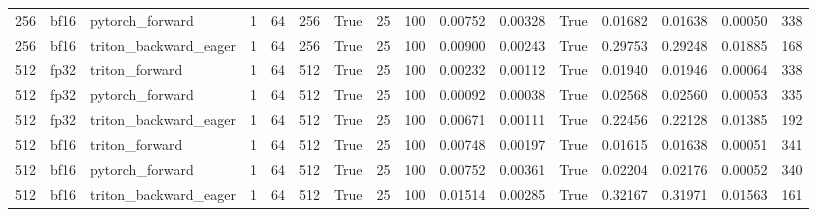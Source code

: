 \begin{tabular}{rllrrrrrrrrrrrrr}
256 & bf16 & pytorch\_forward & 1 & 64 & 256 & True & 25 & 100 & 0.00752 & 0.00328 & True & 0.01682 & 0.01638 & 0.00050 & 338 \\
256 & bf16 & triton\_backward\_eager & 1 & 64 & 256 & True & 25 & 100 & 0.00900 & 0.00243 & True & 0.29753 & 0.29248 & 0.01885 & 168 \\
512 & fp32 & triton\_forward & 1 & 64 & 512 & True & 25 & 100 & 0.00232 & 0.00112 & True & 0.01940 & 0.01946 & 0.00064 & 338 \\
512 & fp32 & pytorch\_forward & 1 & 64 & 512 & True & 25 & 100 & 0.00092 & 0.00038 & True & 0.02568 & 0.02560 & 0.00053 & 335 \\
512 & fp32 & triton\_backward\_eager & 1 & 64 & 512 & True & 25 & 100 & 0.00671 & 0.00111 & True & 0.22456 & 0.22128 & 0.01385 & 192 \\
512 & bf16 & triton\_forward & 1 & 64 & 512 & True & 25 & 100 & 0.00748 & 0.00197 & True & 0.01615 & 0.01638 & 0.00051 & 341 \\
512 & bf16 & pytorch\_forward & 1 & 64 & 512 & True & 25 & 100 & 0.00752 & 0.00361 & True & 0.02204 & 0.02176 & 0.00052 & 340 \\
512 & bf16 & triton\_backward\_eager & 1 & 64 & 512 & True & 25 & 100 & 0.01514 & 0.00285 & True & 0.32167 & 0.31971 & 0.01563 & 161 \\
\bottomrule
\end{tabular}
